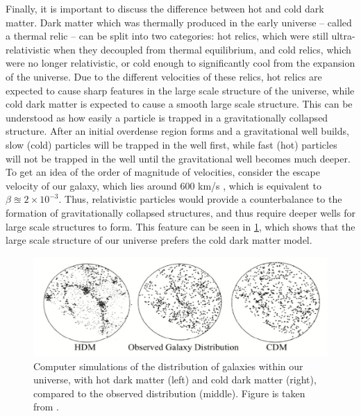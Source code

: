 Finally, it is important to discuss the difference between hot and cold dark matter. Dark matter which was thermally produced in the early universe -- called a thermal relic -- can be split into two categories: hot relics, which were still ultra-relativistic when they decoupled from thermal equilibrium, and cold relics, which were no longer relativistic, or cold enough to significantly cool from the expansion of the universe. Due to the different velocities of these relics, hot relics are expected to cause sharp features in the large scale structure of the universe, while cold dark matter is expected to cause a smooth large scale structure. This can be understood as how easily a particle is trapped in a gravitationally collapsed structure. After an initial overdense region forms and a gravitational well builds, slow (cold) particles will be trapped in the well first, while fast (hot) particles will not be trapped in the well until the gravitational well becomes much deeper. To get an idea of the order of magnitude of velocities, consider the escape velocity of our galaxy, which lies around 600 km/s \cite{MW_escapeVel}, which is equivalent to $\beta \approxeq 2 \times 10^{-3}$. Thus, relativistic particles would provide a counterbalance to the formation of gravitationally collapsed structures, and thus require deeper wells for large scale structures to form. This feature can be seen in \ref{fig:LargeScaleStructure}, which shows that the large scale structure of our universe prefers the cold dark matter model. 

\begin{figure}[h!]
    \centering
    \includegraphics[width=\textwidth]{figures/Galaxy_distributions_by_DM_type.png}
    \caption{Computer simulations of the distribution of galaxies within our universe, with hot dark matter (left) and cold dark matter (right), compared to the observed distribution (middle). Figure is taken from \cite{Ibarra_neutrinos}. }
    \label{fig:LargeScaleStructure}
\end{figure}


